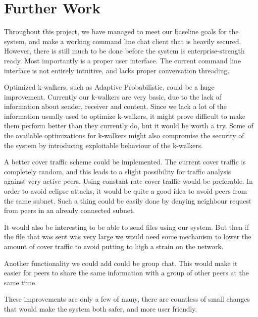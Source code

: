 \section{Further Work}

Throughout this project, we have managed to meet our baseline goals for the system, and make a working command line chat client that is heavily secured. However, there is still much to be done before the system is enterprise-strength ready.
Most importantly is a proper user interface. The current command line interface is not entirely intuitive, and lacks proper conversation threading.

Optimized k-walkers, such as Adaptive Probabilistic, could be a huge improvement. Currently our k-walkers are very basic, due to the lack of information about sender, receiver and content. Since we lack a lot of the information usually used to optimize k-walkers, it might prove difficult to make them perform better than they currently do, but it would be worth a try. Some of the available optimizations for k-walkers might also compromise the security of the system by introducing exploitable behaviour of the k-walkers.

A better cover traffic scheme could be implemented. The current cover traffic is completely random, and this leads to a slight possibility for traffic analysis against very active peers. Using constant-rate cover traffic would be preferable.
In order to avoid eclipse attacks, it would be quite a good idea to avoid peers from the same subnet. Such a thing could be easily  done by denying neighbour request from peers in an  already connected subnet.

It would also be interesting to be able to send files using our system. But then if the file that was sent was very large we would need some mechanism to lower the amount of cover traffic to avoid putting to high a strain on the network.

Another functionality we could add could be group chat. This would make it easier for peers to share the same information with a group of other peers at the same time. 

These improvements are only a few of many, there are countless of small changes that would make the system both safer, and more user friendly.